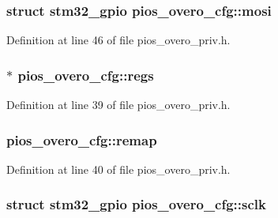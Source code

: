 \hypertarget{structpios__overo__cfg_a5aea93e3a5fcc6249bad26a9ffcccc8a}{
\subsubsection[{mosi}]{\setlength{\rightskip}{0pt plus 5cm}struct {\bf stm32\-\_\-gpio} pios\-\_\-overo\-\_\-cfg\-::mosi}}\label{structpios__overo__cfg_a5aea93e3a5fcc6249bad26a9ffcccc8a}


Definition at line 46 of file pios\-\_\-overo\-\_\-priv.\-h.

\hypertarget{structpios__overo__cfg_ad650bcb134b4b4c297048d8747734b54}{
\subsubsection[{regs}]{$\ast$ pios\-\_\-overo\-\_\-cfg\-::regs}}\label{structpios__overo__cfg_ad650bcb134b4b4c297048d8747734b54}


Definition at line 39 of file pios\-\_\-overo\-\_\-priv.\-h.

\hypertarget{structpios__overo__cfg_a4e5e4acb1ac26af5b7938d2e41387f2d}{
\subsubsection[{remap}]{ pios\-\_\-overo\-\_\-cfg\-::remap}}\label{structpios__overo__cfg_a4e5e4acb1ac26af5b7938d2e41387f2d}


Definition at line 40 of file pios\-\_\-overo\-\_\-priv.\-h.

\hypertarget{structpios__overo__cfg_a5d9ae103e82aa3ea8845e181dd76f19f}{
\subsubsection[{sclk}]{\setlength{\rightskip}{0pt plus 5cm}struct {\bf stm32\-\_\-gpio} pios\-\_\-overo\-\_\-cfg\-::sclk}}\label{structpios__overo__cfg_a5d9ae103e82aa3ea8845e181dd76f19f}



